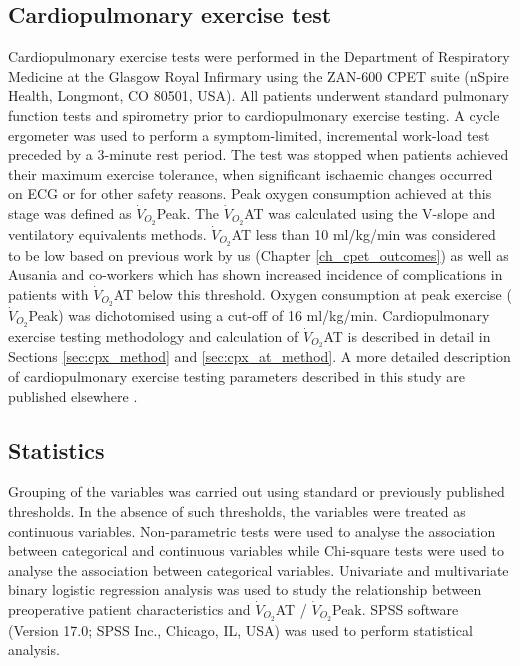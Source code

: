 \subsection{Cardiopulmonary exercise test}
Cardiopulmonary exercise tests were performed in the Department of Respiratory Medicine at the Glasgow Royal Infirmary using the ZAN-600 CPET suite (nSpire Health, Longmont, CO 80501, USA). 
All patients underwent standard pulmonary function tests and spirometry prior to cardiopulmonary exercise testing. 
A cycle ergometer was used to perform a symptom-limited, incremental work-load test preceded by a 3-minute rest period. 
The test was stopped when patients achieved their maximum exercise tolerance, when significant ischaemic changes occurred on ECG or for other safety reasons. 
Peak oxygen consumption achieved at this stage was defined as $\dot{V}_{O_2}$Peak. 
The $\dot{V}_{O_2}$AT was calculated using the V-slope \parencite{beaver_new_1986,sue_metabolic_1988} and ventilatory equivalents \parencite{society_ats/accp_2003} methods.
$\dot{V}_{O_2}$AT less than 10 ml/kg/min was considered to be low based on previous work by us (Chapter \ref{ch_cpet_outcomes}) as well as Ausania and co-workers \parencite{ausania_effects_2012} which has shown increased incidence of complications in patients with $\dot{V}_{O_2}$AT below this threshold. 
Oxygen consumption at peak exercise ($\dot{V}_{O_2}$Peak) was dichotomised using a cut-off of 16 ml/kg/min. 
Cardiopulmonary exercise testing methodology and calculation of $\dot{V}_{O_2}$AT is described in detail in Sections \ref{sec:cpx_method} and \ref{sec:cpx_at_method}.
A more detailed description of cardiopulmonary exercise testing parameters described in this study are published elsewhere \parencite{balady_clinicians_2010}.

\subsection{Statistics}
Grouping of the variables was carried out using standard or previously published thresholds. 
In the absence of such thresholds, the variables were treated as continuous variables. 
Non-parametric tests were used to analyse the association between categorical and continuous variables while Chi-square tests were used to analyse the association between categorical variables. 
Univariate and multivariate binary logistic regression analysis was used to study the relationship between preoperative patient characteristics and $\dot{V}_{O_2}$AT / $\dot{V}_{O_2}$Peak. 
SPSS software (Version 17.0; SPSS Inc., Chicago, IL, USA) was used to perform statistical analysis.

